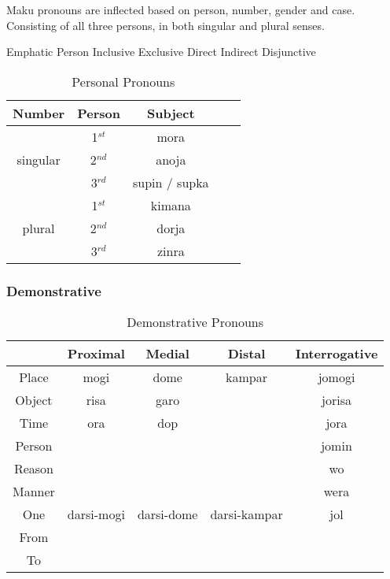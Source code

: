 \documentclass{article}
\begin{document}
    Maku pronouns are inflected based on person, number, gender and case. Consisting of all three persons, in both singular and plural senses. 

    Emphatic
    Person
    Inclusive
    Exclusive
    Direct
    Indirect
    Disjunctive

         \begin{table}[htp]
    \centering
              \begin{tabular}{c|c|ccc}
                  \toprule
                  Number & Person & Subject \\ \midrule
                  & 1$^{st}$ & mora \\
                  singular & 2$^{nd}$ & anoja \\
                  & 3$^{rd}$ & supin / supka \\ \midrule
                   & 1$^{st}$ & kimana \\          
                   plural & 2$^{nd}$ & dorja \\                     
                   & 3$^{rd}$ & zinra \\ 
                  \bottomrule  
              \end{tabular}
        \caption{Personal Pronouns} 
         \end{table} 


    \subsubsection{Demonstrative}

          \begin{table}[htp]
     \centering
               \begin{tabular}{c|cccc}
                   \toprule
                   & Proximal & Medial & Distal & Interrogative \\ \midrule
                   Place & mogi & dome & kampar & jomogi\\
                   Object & risa & garo & & jorisa \\
                   Time & ora & dop & & jora \\
                   Person & & & & jomin \\
                   Reason & & & & wo\\
                   Manner & & & & wera\\
                   One & darsi-mogi & darsi-dome & darsi-kampar & jol\\
                   From & &\\
                   To & &\\
                   \bottomrule  
               \end{tabular}
         \caption{Demonstrative Pronouns} 
          \end{table} 
 
\end{document}

